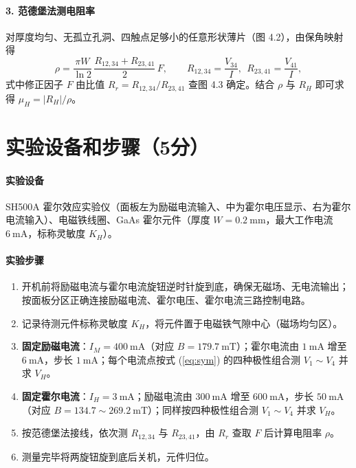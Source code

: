 \documentclass[12pt,a4paper]{ctexart}
\begin{document}
\paragraph{3. 范德堡法测电阻率}
对厚度均匀、无孤立孔洞、四触点足够小的任意形状薄片（图 4.2），由保角映射得
\begin{equation}
    \rho=\frac{\pi W}{\ln 2}\,\frac{R_{12,34}+R_{23,41}}{2}\,F,\qquad
    R_{12,34}=\frac{V_{34}}{I},\ \ R_{23,41}=\frac{V_{41}}{I},
\end{equation}
式中修正因子 $F$ 由比值 $R_r=R_{12,34}/R_{23,41}$ 查图 4.3 确定。结合 $\rho$ 与 $R_H$ 即可求得 $\mu_H=|R_H|/\rho$。

\section*{实验设备和步骤（5分）}
\paragraph{实验设备}
SH500A 霍尔效应实验仪（面板左为励磁电流输入、中为霍尔电压显示、右为霍尔电流输入）、电磁铁线圈、GaAs 霍尔元件（厚度 $W=0.2\ \mathrm{mm}$，最大工作电流 $6\ \mathrm{mA}$，标称灵敏度 $K_H$）。

\paragraph{实验步骤}
\begin{enumerate}
    \item 开机前将励磁电流与霍尔电流旋钮逆时针旋到底，确保无磁场、无电流输出；按面板分区正确连接励磁电流、霍尔电压、霍尔电流三路控制电路。
    \item 记录待测元件标称灵敏度 $K_H$，将元件置于电磁铁气隙中心（磁场均匀区）。
    \item \textbf{固定励磁电流}：$I_M=400\ \mathrm{mA}$（对应 $B=179.7\ \mathrm{mT}$）；霍尔电流由 $1\ \mathrm{mA}$ 增至 $6\ \mathrm{mA}$，步长 $1\ \mathrm{mA}$；每个电流点按式 (\ref{eq:sym}) 的四种极性组合测 $V_1\!\sim\!V_4$ 并求 $V_H$。
    \item \textbf{固定霍尔电流}：$I_H=3\ \mathrm{mA}$；励磁电流由 $300\ \mathrm{mA}$ 增至 $600\ \mathrm{mA}$，步长 $50\ \mathrm{mA}$（对应 $B=134.7\!\sim\!269.2\ \mathrm{mT}$）；同样按四种极性组合测 $V_1\!\sim\!V_4$ 并求 $V_H$。
    \item 按范德堡法接线，依次测 $R_{12,34}$ 与 $R_{23,41}$，由 $R_r$ 查取 $F$ 后计算电阻率 $\rho$。
    \item 测量完毕将两旋钮旋到底后关机，元件归位。
\end{enumerate}
\end{document}
